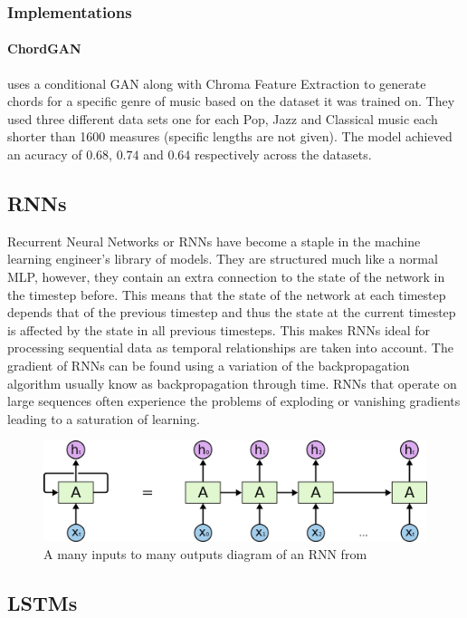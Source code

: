 \subsubsection{Implementations}

\paragraph{ChordGAN} \cite{ChordGAN} uses a conditional GAN along with Chroma Feature Extraction to generate chords for a specific genre of music based on the dataset it was trained on.
They used three different data sets one for each Pop, Jazz and Classical music each shorter than 1600 measures (specific lengths are not given).
The model achieved an acuracy of $0.68$, $0.74$ and $0.64$ respectively across the datasets.

\subsection{RNNs}

Recurrent Neural Networks or RNNs have become a staple in the machine learning engineer's library of models. 
They are structured much like a normal MLP, however, they contain an extra connection to the state of the network in the timestep before.
This means that the state of the network at each timestep depends that of the previous timestep and thus the state at the current timestep is affected by the state in all previous timesteps.
This makes RNNs ideal for processing sequential data as temporal relationships are taken into account.
The gradient of RNNs can be found using a variation of the backpropagation algorithm usually know as backpropagation through time.
RNNs that operate on large sequences often experience the problems of exploding or vanishing gradients leading to a saturation of learning.

\begin{figure}
    \centering
    \includegraphics[width=0.8\columnwidth]{Figures/RNN}
    \decoRule
    \caption[An RNN]{A many inputs to many outputs diagram of an RNN from \cite{oinkina}}
    \label{fig:RNN}
\end{figure}

\subsection{LSTMs}

